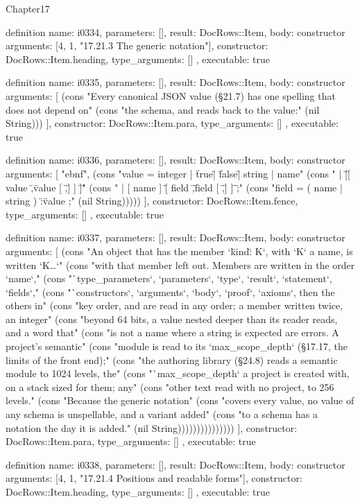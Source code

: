 \begin{lexlean}{Chapter17}
\begin{semanticmodule}
definition{
  name: i0334,
  parameters: [],
  result: DocRows::Item,
  body: constructor{
    arguments: [4, 1, "17.21.3 The generic notation"],
    constructor: DocRows::Item.heading,
    type_arguments: []
  },
  executable: true
}

definition{
  name: i0335,
  parameters: [],
  result: DocRows::Item,
  body: constructor{
    arguments: [
      (cons "Every canonical JSON value (§21.7) has one spelling that does not depend on" (cons "the schema, and reads back to the value:" (nil String)))
    ],
    constructor: DocRows::Item.para,
    type_arguments: []
  },
  executable: true
}

definition{
  name: i0336,
  parameters: [],
  result: DocRows::Item,
  body: constructor{
    arguments: [
      "ebnf",
      (cons "value  = integer | \"true\" | \"false\" | string | name" (cons "       | \"[\" [ value { \",\" value } [ \",\" ] ] \"]\"" (cons "       | [ name ] \"{\" [ field { \",\" field } [ \",\" ] ] \"}\" ;" (cons "field  = ( name | string ) \":\" value ;" (nil String)))))
    ],
    constructor: DocRows::Item.fence,
    type_arguments: []
  },
  executable: true
}

definition{
  name: i0337,
  parameters: [],
  result: DocRows::Item,
  body: constructor{
    arguments: [
      (cons "An object that has the member `\"kind\": K`, with `K` a name, is written `K{…}`" (cons "with that member left out. Members are written in the order `name`," (cons "`type_parameters`, `parameters`, `type`, `result`, `statement`, `fields`," (cons "`constructors`, `arguments`, `body`, `proof`, `axioms`, then the others in" (cons "key order, and are read in any order; a member written twice, an integer" (cons "beyond 64 bits, a value nested deeper than its reader reads, and a word that" (cons "is not a name where a string is expected are errors. A project's semantic" (cons "module is read to its `max_scope_depth` (§17.17, the limits of the front end);" (cons "the authoring library (§24.8) reads a semantic module to 1024 levels, the" (cons "`max_scope_depth` a project is created with, on a stack sized for them; any" (cons "other text read with no project, to 256 levels." (cons "Because the generic notation" (cons "covers every value, no value of any schema is unspellable, and a variant added" (cons "to a schema has a notation the day it is added." (nil String)))))))))))))))
    ],
    constructor: DocRows::Item.para,
    type_arguments: []
  },
  executable: true
}

definition{
  name: i0338,
  parameters: [],
  result: DocRows::Item,
  body: constructor{
    arguments: [4, 1, "17.21.4 Positions and readable forms"],
    constructor: DocRows::Item.heading,
    type_arguments: []
  },
  executable: true
}


\end{semanticmodule}
\end{lexlean}
